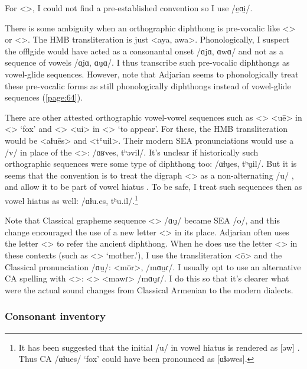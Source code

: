 For <>, I could not find a pre-established convention so I use /e̯ɑi̯/. 
	
There is some ambiguity when an orthographic diphthong is pre-vocalic like <> or <>. The HMB transliteration is just <aya, awa>. Phonologically, I suspect the offlgide would have acted as a consonantal onset /ɑjɑ, ɑwɑ/ and not as a sequence of vowels /ɑi̯ɑ, ɑu̯ɑ/. I thus transcribe such pre-vocalic diphthongs as vowel-glide sequences. However, note that Adjarian seems to phonologically treat these pre-vocalic forms as still phonologically diphthongs instead of vowel-glide sequences (\ref{page:64}). 




There are other attested orthographic vowel-vowel sequences such as <> <uē> in <> `fox' and <> <ui> in <> `to appear'. For these, the HMB transliteration would be <aɫuēs> and <tʿuil>. Their modern SEA pronunciations would use a /v/ in place of the <>: /ɑʁves, tʰəvil/. It's unclear if historically such orthographic sequences were some type of diphthong too: /ɑɫu̯es, tʰu̯il/. But it is seems that the convention is to treat the digraph <> as a non-alternating /u/ \citep[15]{Thomson-1989-IntroClassicalArmenian}, and allow it to be part of vowel hiatus \citep[17]{Thomson-1989-IntroClassicalArmenian}. To be safe, I treat such sequences then as vowel hiatus as well: /ɑɫu.es, tʰu.il/.\footnote{It has been suggested that the initial /u/ in vowel hiatus is rendered as [əw] \citep[13]{Kim-2021-phoneticsPhonologyOldArmenianWV}. Thus CA /ɑɫues/ `fox' could have been pronounced as [ɑɫəwes].  }

Note that Classical grapheme sequence <> /ɑu̯/ became SEA /o/, and this change encouraged the use of a new letter <> in its place. Adjarian often uses the letter <> to refer the ancient diphthong. When he does use the letter <> in these contexts (such as <> `mother.{\gen}'), I use the transliteration <ō> and the Classical pronunciation /ɑu̯/: <mōr>, /mɑu̯ɾ/. I usually opt to use an alternative CA spelling with <>: <> <mawɾ> /mɑu̯ɾ/. I do this so that it's clearer what were the actual sound changes from Classical Armenian to the modern dialects. 


\subsubsection{Consonant inventory}\label{sec:HossepIntro:phonotransc:CA:cons}



